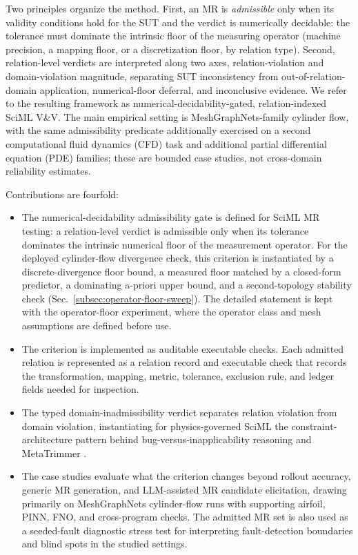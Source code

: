 \documentclass[preprint,12pt,authoryear]{elsarticle}
\begin{document}
Two principles organize the method. First, an MR is \emph{admissible} only when its validity conditions hold for the SUT and the verdict is numerically decidable: the tolerance must dominate the intrinsic floor of the measuring operator (machine precision, a mapping floor, or a discretization floor, by relation type). Second, relation-level verdicts are interpreted along two axes, relation-violation and domain-violation magnitude, separating SUT inconsistency from out-of-relation-domain application, numerical-floor deferral, and inconclusive evidence. We refer to the resulting framework as numerical-decidability-gated, relation-indexed SciML V\&V. The main empirical setting is MeshGraphNets-family cylinder flow, with the same admissibility predicate additionally exercised on a second computational fluid dynamics (CFD) task and additional partial differential equation (PDE) families; these are bounded case studies, not cross-domain reliability estimates.

Contributions are fourfold:
\begin{itemize}[leftmargin=*]
\item The numerical-decidability admissibility gate is defined for SciML MR testing: a relation-level verdict is admissible only when its tolerance dominates the intrinsic numerical floor of the measurement operator. For the deployed cylinder-flow divergence check, this criterion is instantiated by a discrete-divergence floor bound, a measured floor matched by a closed-form predictor, a dominating a-priori upper bound, and a second-topology stability check (Sec.~\ref{subsec:operator-floor-sweep}). The detailed statement is kept with the operator-floor experiment, where the operator class and mesh assumptions are defined before use.

\item The criterion is implemented as auditable executable checks. Each admitted relation is represented as a relation record and executable check that records the transformation, mapping, metric, tolerance, exclusion rule, and ledger fields needed for inspection.

\item The typed domain-inadmissibility verdict separates relation violation from domain violation, instantiating for physics-governed SciML the constraint-architecture pattern behind bug-versus-inapplicability reasoning \citep{duqueTorres2023bugornot,duqueTorres2023completePipeline} and MetaTrimmer \citep{duqueTorres2023metaTrimmer}.

\item The case studies evaluate what the criterion changes beyond rollout accuracy, generic MR generation, and LLM-assisted MR candidate elicitation, drawing primarily on MeshGraphNets cylinder-flow runs with supporting airfoil, PINN, FNO, and cross-program checks. The admitted MR set is also used as a seeded-fault diagnostic stress test for interpreting fault-detection boundaries and blind spots in the studied settings.
\end{itemize}
\end{document}
